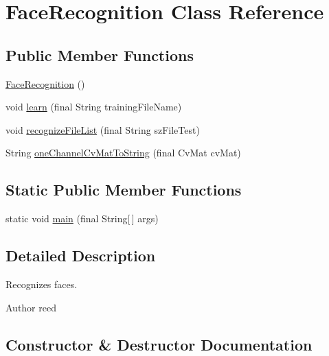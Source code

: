 \hypertarget{class_face_recognition}{}\section{Face\+Recognition Class Reference}
\label{class_face_recognition}
\subsection*{Public Member Functions}
\begin{DoxyCompactItemize}
\item 
\hyperlink{class_face_recognition_a67268b1b0425fdc6c51325af4f11b996}{Face\+Recognition} ()
\item 
void \hyperlink{class_face_recognition_ae14c678f8d6cc79f6bbf2f6006bc2bfe}{learn} (final String training\+File\+Name)
\item 
void \hyperlink{class_face_recognition_af034efed8faf784e9c2dbc47c5a74948}{recognize\+File\+List} (final String sz\+File\+Test)
\item 
String \hyperlink{class_face_recognition_a5cf633ba1ff2fb417fe8222e59f71121}{one\+Channel\+Cv\+Mat\+To\+String} (final Cv\+Mat cv\+Mat)
\end{DoxyCompactItemize}
\subsection*{Static Public Member Functions}
\begin{DoxyCompactItemize}
\item 
static void \hyperlink{class_face_recognition_a91ce1a71bccdda7c6fd58f54f5abc80f}{main} (final String\mbox{[}$\,$\mbox{]} args)
\end{DoxyCompactItemize}


\subsection{Detailed Description}
Recognizes faces.

\begin{DoxyAuthor}{Author}
reed 
\end{DoxyAuthor}


\subsection{Constructor \& Destructor Documentation}
\hypertarget{class_face_recognition_a67268b1b0425fdc6c51325af4f11b996}{}
